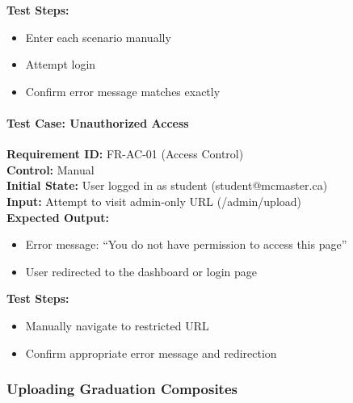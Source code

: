 \documentclass[12pt, titlepage]{article}
\begin{document}
\textbf{Test Steps:}
\begin{itemize}
    \item Enter each scenario manually
    \item Attempt login
    \item Confirm error message matches exactly
\end{itemize}

\paragraph{Test Case: Unauthorized Access}
\textbf{Requirement ID:} FR-AC-01 (Access Control) \\
\textbf{Control:} Manual \\
\textbf{Initial State:} User logged in as student (student@mcmaster.ca) \\
\textbf{Input:} Attempt to visit admin-only URL (/admin/upload) \\
\textbf{Expected Output:}
\begin{itemize}
    \item Error message: ``You do not have permission to access this page''
    \item User redirected to the dashboard or login page
\end{itemize}
\textbf{Test Steps:}
\begin{itemize}
    \item Manually navigate to restricted URL
    \item Confirm appropriate error message and redirection
\end{itemize}

\subsubsection{Uploading Graduation Composites}
\end{document}
